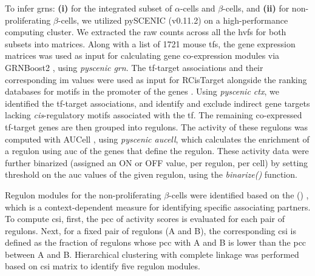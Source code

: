 \par To infer \glspl{grn}: \textbf{(i)} for the integrated subset of $\alpha$-cells and $\beta$-cells, and \textbf{(ii)} for non-proliferating $\beta$-cells, we utilized pySCENIC (v0.11.2) \textbf{\cite{kumar_inference_2021}} on a high-performance computing cluster. We extracted the raw counts across all the \glspl{hvf} for both subsets into matrices. Along with a list of 1721 mouse \glspl{tf}, the gene expression matrices was used as input for calculating gene co-expression modules via GRNBoost2 \textbf{\cite{moerman_grnboost2_2019}}, using \textit{pyscenic grn}. The \gls{tf}-target associations and their corresponding \gls{im} values were used as input for RCisTarget alongside the ranking databases for motifs in the promoter of the genes \textbf{\cite{noauthor_rcistarget_nodate}}. Using \textit{pyscenic ctx}, we identified the \gls{tf}-target associations, and identify and exclude indirect gene targets lacking \textit{cis}-regulatory motifs associated with the \gls{tf}. The remaining co-expressed \gls{tf}-target genes are then grouped into regulons. The activity of these regulons was computed with AUCell \textbf{\cite{noauthor_aucell_nodate}}, using \textit{pyscenic aucell}, which calculates the enrichment of a regulon using \gls{auc} of the genes that define the regulon. These activity data were further binarized (assigned an ON or OFF value, per regulon, per cell) by setting threshold on the \gls{auc} values of the given regulon, using the \textit{binarize()} function.\\

\par Regulon modules for the non-proliferating $\beta$-cells were identified based on the  () \textbf{\cite{fuxman_bass_using_2013}}, which is a context-dependent measure for identifying specific associating partners. To compute \gls{csi}, first, the \gls{pcc} of activity scores is evaluated for each pair of regulons. Next, for a fixed pair of regulons (A and B), the corresponding \gls{csi} is defined as the fraction of regulons whose \gls{pcc} with A and B is lower than the \gls{pcc} between A and B. Hierarchical clustering with complete linkage was performed based on \gls{csi} matrix to identify five regulon modules.\\

